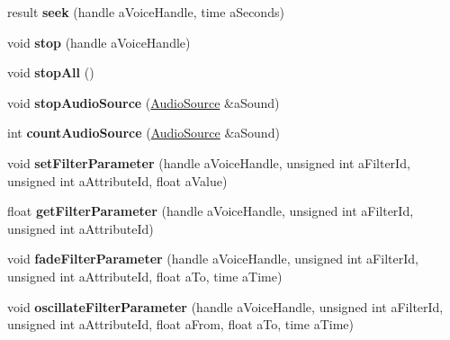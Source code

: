\begin{DoxyCompactItemize}
\item 
\mbox{\label{class_so_loud_1_1_soloud_a5b8d1ae5f4b8b5cb45b0b93ffe130ee9}} 
result {\bfseries seek} (handle a\+Voice\+Handle, time a\+Seconds)
\item 
\mbox{\label{class_so_loud_1_1_soloud_a04712e8863bb2a1078251f91d4a6d776}} 
void {\bfseries stop} (handle a\+Voice\+Handle)
\item 
\mbox{\label{class_so_loud_1_1_soloud_ab1fa4f692ae99cc1fac597d67958c1ce}} 
void {\bfseries stop\+All} ()
\item 
\mbox{\label{class_so_loud_1_1_soloud_ab0079b4ee6360bceff408df9c2bee634}} 
void {\bfseries stop\+Audio\+Source} (\mbox{\hyperlink{class_so_loud_1_1_audio_source}{Audio\+Source}} \&a\+Sound)
\item 
\mbox{\label{class_so_loud_1_1_soloud_a3d3eeb1f4145f1999c45c3e2f4ed948e}} 
int {\bfseries count\+Audio\+Source} (\mbox{\hyperlink{class_so_loud_1_1_audio_source}{Audio\+Source}} \&a\+Sound)
\item 
\mbox{\label{class_so_loud_1_1_soloud_af9871d1329e2d5613d99ff34c17e1ea2}} 
void {\bfseries set\+Filter\+Parameter} (handle a\+Voice\+Handle, unsigned int a\+Filter\+Id, unsigned int a\+Attribute\+Id, float a\+Value)
\item 
\mbox{\label{class_so_loud_1_1_soloud_a83072ac27d31de55084c6160eecfa72f}} 
float {\bfseries get\+Filter\+Parameter} (handle a\+Voice\+Handle, unsigned int a\+Filter\+Id, unsigned int a\+Attribute\+Id)
\item 
\mbox{\label{class_so_loud_1_1_soloud_a342a6968934617d9b38fa380f9dbf512}} 
void {\bfseries fade\+Filter\+Parameter} (handle a\+Voice\+Handle, unsigned int a\+Filter\+Id, unsigned int a\+Attribute\+Id, float a\+To, time a\+Time)
\item 
\mbox{\label{class_so_loud_1_1_soloud_ab422df9ba2b61c6453347ee99307b490}} 
void {\bfseries oscillate\+Filter\+Parameter} (handle a\+Voice\+Handle, unsigned int a\+Filter\+Id, unsigned int a\+Attribute\+Id, float a\+From, float a\+To, time a\+Time)

\end{DoxyCompactItemize}
